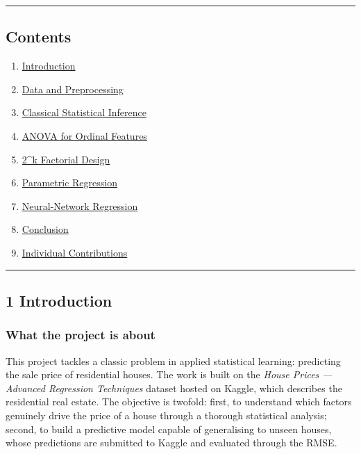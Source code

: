 \begin{center}\rule{0.5\linewidth}{0.5pt}\end{center}

\subsection{Contents}\label{contents}

\begin{enumerate}
\def\labelenumi{\arabic{enumi}.}
\tightlist
\item
  \hyperref[1-introduction]{Introduction}
\item
  \hyperref[2-data-and-preprocessing]{Data and Preprocessing}
\item
  \hyperref[3-classical-statistical-inference]{Classical Statistical
  Inference}
\item
  \hyperref[4-anova-for-ordinal-features]{ANOVA for Ordinal Features}
\item
  \hyperref[5-2k-factorial-design]{2\^{}k Factorial Design}
\item
  \hyperref[6-parametric-regression]{Parametric Regression}
\item
  \hyperref[7-neural-network-regression]{Neural-Network Regression}
\item
  \hyperref[8-conclusion]{Conclusion}
\item
  \hyperref[individual-contributions]{Individual Contributions}
\end{enumerate}

\begin{center}\rule{0.5\linewidth}{0.5pt}\end{center}

\subsection{1 Introduction}\label{introduction}

\subsubsection{What the project is
about}\label{what-the-project-is-about}

This project tackles a classic problem in applied statistical learning:
predicting the sale price of residential houses. The work is built on
the \emph{House Prices --- Advanced Regression Techniques} dataset
hosted on Kaggle, which describes the residential real estate. The
objective is twofold: first, to understand which factors genuinely drive
the price of a house through a thorough statistical analysis; second, to
build a predictive model capable of generalising to unseen houses, whose
predictions are submitted to Kaggle and evaluated through the RMSE.

